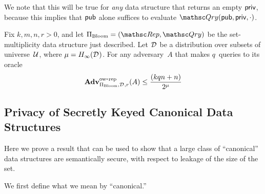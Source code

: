 We note that this will be true for \emph{any} data structure that returns an empty ${\sf priv}$, because this implies that ${\sf pub}$ alone suffices to evaluate $\Qry(\pubaux,\privaux,\cdot)$.  

\begin{theorem}\label{thm3}\label{thm:bf-ow} 
Fix $k,m,n,r>0$, and let $\setprim_{\mathrm{Bloom}}= (\Rep, \Qry)$ be the set-multiplicity data structure just described. Let $\mathcal{D}_{}^{}$ be a distribution over subsets of universe~${\cal U}$, where $\mu = H_\infty(\mathcal{D}_{}^{})$.  For any adversary~$A$ that makes $q$~queries to its oracle
\[
\mathrm{\mathbf{Adv}}^{\mathrm{ow\mbox{-}rep}}_{\Pi_{\mathrm{Bloom}},\mathcal{D}_{}^{},r}(A) \leq  \frac{(kqn+n)}{2^{\mu}}
\]
\end{theorem}


\subsection{Privacy of Secretly Keyed Canonical Data Structures}
Here we prove a result that can be used to show that a large class of ``canonical''
data structures are semantically secure, with respect to leakage of the size of the set.

We first define what we mean by ``canonical.''


